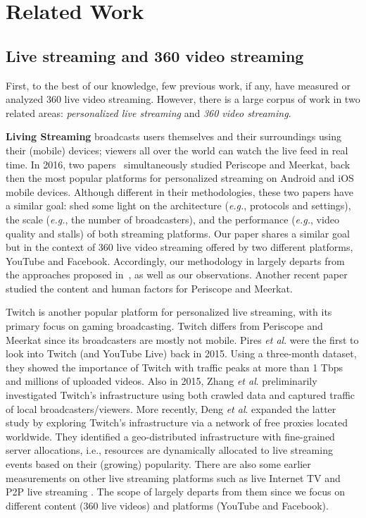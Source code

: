 \chapter{Related Work} \label{chap:related}


\section{Live streaming and 360\degree{} video streaming}
First, to the best of our knowledge, few previous work, if any, have
measured or analyzed 360\degree{} live video streaming. However, there
is a large corpus of work in two related areas: \emph{personalized live streaming} and \emph{360\degree{} video streaming}.

\textbf{Living Streaming} broadcasts users themselves
and their surroundings using their (mobile) devices; viewers all
over the world can watch the live feed in real time. In 2016, two
papers~\cite{siekkinen2016first,wang2016anatomy} simultaneously studied Periscope and Meerkat, back
then the most popular platforms for personalized streaming on Android
and iOS mobile devices. Although different in their methodologies,
these two papers have a similar goal: shed some light on the
architecture (\emph{e.g.}, protocols and settings), the scale (\emph{e.g.}, the number
of broadcasters), and the performance (\emph{e.g.}, video quality and stalls)
of both streaming platforms. Our paper shares a similar goal but
in the context of 360\degree{} live video streaming offered by two different
platforms, YouTube and Facebook. Accordingly, our methodology in \lime
largely departs from the approaches proposed in~\cite{siekkinen2016first,wang2016anatomy}, as well
as our observations. Another recent paper~\cite{tang2016meerkat} studied the content and human
factors for Periscope and Meerkat.

Twitch is another popular platform for personalized live streaming,
with its primary focus on gaming broadcasting. Twitch differs
from Periscope and Meerkat since its broadcasters are mostly not
mobile. Pires \emph{et al}. \cite{pires2015youtube} were the first to look into Twitch (and
YouTube Live) back in 2015. Using a three-month dataset, they
showed the importance of Twitch with traffic peaks at more than
1 Tbps and millions of uploaded videos. Also in 2015, Zhang \emph{et al}. \cite{zhang2015crowdsourced} preliminarily investigated Twitch’s infrastructure using
both crawled data and captured traffic of local broadcasters/viewers.
More recently, Deng \emph{et al}. \cite{deng2017internet} expanded the latter study by exploring
Twitch’s infrastructure via a network of free proxies located
worldwide. They identified a geo-distributed infrastructure with
fine-grained server allocations, i.e., resources are dynamically allocated
to live streaming events based on their (growing) popularity.
There are also some earlier measurements on other live
streaming platforms such as live Internet TV and P2P live streaming
\cite{hei2007measurement,kaytoue2012watch,li2011measurement,silverston2007measuring,sripanidkulchai2004analysis}. The scope of \lime largely departs from them since we
focus on different content (360\degree{} live videos) and platforms (YouTube
and Facebook).

